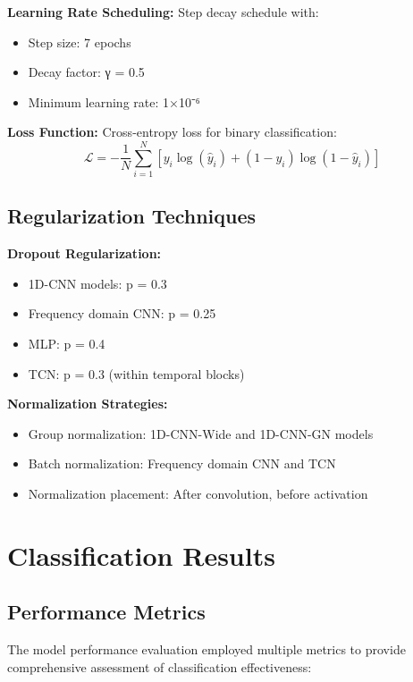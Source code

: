 \documentclass[12pt]{article}
\begin{document}
\textbf{Learning Rate Scheduling:}
Step decay schedule with:
\begin{itemize}
    \item Step size: 7 epochs
    \item Decay factor: γ = 0.5
    \item Minimum learning rate: 1×10⁻⁶
\end{itemize}

\textbf{Loss Function:}
Cross-entropy loss for binary classification:
\begin{equation}
\mathcal{L} = -\frac{1}{N}\sum_{i=1}^{N} [y_i \log(\hat{y}_i) + (1-y_i)\log(1-\hat{y}_i)]
\end{equation}

\subsection{Regularization Techniques}

\textbf{Dropout Regularization:}
\begin{itemize}
    \item 1D-CNN models: p = 0.3
    \item Frequency domain CNN: p = 0.25  
    \item MLP: p = 0.4
    \item TCN: p = 0.3 (within temporal blocks)
\end{itemize}

\textbf{Normalization Strategies:}
\begin{itemize}
    \item Group normalization: 1D-CNN-Wide and 1D-CNN-GN models
    \item Batch normalization: Frequency domain CNN and TCN
    \item Normalization placement: After convolution, before activation
\end{itemize}

\section{Classification Results}

\subsection{Performance Metrics}

The model performance evaluation employed multiple metrics to provide comprehensive assessment of classification effectiveness:
\end{document}
